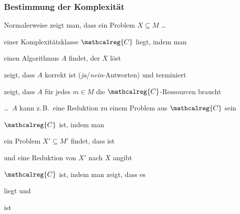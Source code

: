     \begin{frame}
      \frametitle{Bestimmung der Komplexität}
      
      Normalerweise zeigt man, dass ein Problem $X \subseteq M$ \dots
      \begin{Itemize}
        \item
           einer Komplexitätsklasse $\mathcalreg{C}$ liegt, indem man
          \begin{Itemize}
            \item
              einen Algorithmus $A$ findet, der $X$ löst
            \item
              zeigt, dass $A$ korrekt ist (\emph{ja}/\emph{nein}-Antworten) und terminiert
            \item
              zeigt, dass $A$ für jedes $m\in M$  die $\mathcalreg{C}$-Ressourcen braucht
            \item[]
              \dots\ $A$ kann z.\,B.\ eine Reduktion zu einem Problem aus $\mathcalreg{C}$ sein
          \end{Itemize}
          \par\smallskip
        \item<2->
           $\mathcalreg{C}$ ist, indem man
          \begin{Itemize}
            \item
              ein Problem $X' \subseteq M'$ findet, dass  ist
            \item
              und eine Reduktion von $X'$ nach $X$ angibt
          \end{Itemize}
          \par\smallskip
        \item<3->
           $\mathcalreg{C}$ ist, indem man zeigt, dass es
          \begin{Itemize}
            \item
               liegt und
            \item
               ist
          \end{Itemize}
      \end{Itemize}
    \end{frame}

